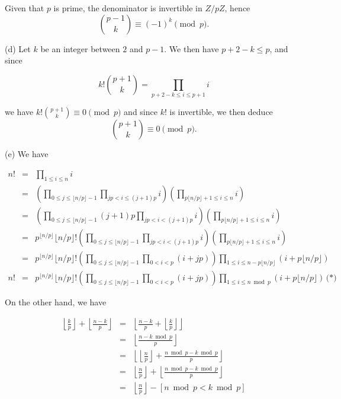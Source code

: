 \documentclass[a4paper,12pt]{article}
\newcommand{\subpar}[1]{\medskip \noindent (#1)}
\begin{document}
Given that $p$ is prime, the denominator is invertible in $Z/pZ$,
hence
\[ {{p-1} \choose k} \equiv (-1)^k \pmod p.\]

\subpar{d} Let $k$ be an integer between $2$ and $p-1$. We then have $p+2-k
\le p$, and since

\[  k!{{p+1} \choose k} = \prod_{p+2-k\le i\le p+1} i \]

we have $k! {{p+1} \choose k} \equiv 0 \pmod p$ and since $k!$ is invertible, we
then deduce
\[ {{p+1} \choose k} \equiv 0 \pmod p.\]

\subpar{e} We have

\begin{eqnarray*}
  n! &=& \prod_{1\le i\le n} i \\
  &=& \left( \prod_{0 \le j \le \lfloor n/p\rfloor - 1} \prod_{jp < i
    \le (j+1)p} i \right) \left( \prod_{p\lfloor n/p\rfloor + 1 \le i
    \le n} i\right) \\
  &=& \left( \prod_{0 \le j\le \lfloor n/p\rfloor - 1} (j+1)p
  \prod_{jp < i <(j+1)p} i \right)\left( \prod_{p\lfloor n/p\rfloor +
    1 \le i \le n} i\right) \\
  &=& p^{\lfloor n/p\rfloor} \lfloor n/p\rfloor!
  \left( \prod_{ 0 \le j \le \lfloor n/p\rfloor - 1} \prod_{jp < i <
    (j+1)p} i\right)\left( \prod_{p\lfloor n/p\rfloor + 1 \le i \le n}
  i\right) \\
  &=& p^{\lfloor n/p\rfloor} \lfloor n/p\rfloor! \left( \prod_{0\le j
    \le \lfloor n/p\rfloor - 1} \prod_{0 < i < p}(i+jp)\right)
  \prod_{1\le i\le n - p \lfloor n/p\rfloor} (i+p\lfloor n/p\rfloor) \\
  n!  &=& p^{\lfloor n/p\rfloor} \lfloor n/p\rfloor! \left( \prod_{0\le j
    \le \lfloor n/p\rfloor - 1} \prod_{0 < i < p}(i+jp)\right)
  \prod_{1\le i\le n \bmod p} (i+p\lfloor n/p\rfloor)\, \mbox{(*)}
\end{eqnarray*}

On the other hand, we have

\begin{eqnarray*}
  \left\lfloor \frac{k}{p}\right\rfloor + \left\lfloor
  \frac{n-k}{p}\right\rfloor &=& \left\lfloor \frac{n-k}{p} + \left\lfloor
  \frac{k}{p}\right\rfloor\right\rfloor \\
  &=& \left\lfloor \frac{n - k \bmod p}{p}\right\rfloor \\
  &=& \left\lfloor \left\lfloor \frac{n}{p}\right\rfloor + \frac{n
    \bmod p - k\bmod p}{p}\right\rfloor \\
  &=& \left\lfloor \frac{n}{p}\right\rfloor + \left\lfloor  \frac{n
    \bmod p - k\bmod p}{p}\right\rfloor \\
  &=& \left\lfloor \frac{n}{p} \right\rfloor - [ n\bmod p < k\bmod p ]
\end{eqnarray*}
\end{document}
